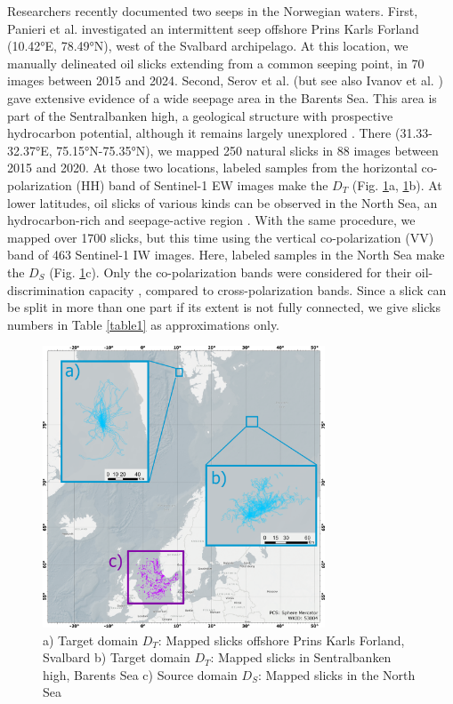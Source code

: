 \documentclass[journal]{IEEEtran}
\begin{document}
Researchers recently documented two seeps in the Norwegian waters. First, Panieri et al. \cite{panieriArcticNaturalOil2024} investigated an intermittent seep offshore Prins Karls Forland 
(10.42°E, 78.49°N), west of the Svalbard archipelago. At this location, we manually delineated oil slicks extending from a common seeping point, in 70 images between 2015 and 2024.
Second, Serov et al. \cite{serovWidespreadNaturalMethane2023} (but see also Ivanov et al. \cite{ivanovSearchDetectionNatural2020}) gave extensive evidence of a wide seepage area in the Barents Sea. 
This area is part of the Sentralbanken high, a geological structure with prospective hydrocarbon potential, although it remains largely unexplored \cite{lundschienNorthBarentsComposite2025}. 
There (31.33-32.37°E, 75.15°N-75.35°N), we mapped 250 natural slicks in 88 images between 2015 and 2020.
At those two locations, labeled samples from the horizontal co-polarization (HH) band of Sentinel-1 EW images make the $\mathit{D}_T$ (Fig. \ref{figure1}a, \ref{figure1}b). 
At lower latitudes, oil slicks of various kinds can be observed in the North Sea, an hydrocarbon-rich and seepage-active region \cite{juddSeabedFluidFlow2009,hovlandSeabedPockmarksSeepages1988}. 
With the same procedure, we mapped over 1700 slicks, but this time using the vertical co-polarization (VV) band of 463 Sentinel-1 IW images. Here, labeled samples in the North Sea make the $\mathit{D}_S$ (Fig. \ref{figure1}c).
Only the co-polarization bands were considered for their oil-discrimination capacity \cite{johanssonMultifrequencyPolarimetricSAR2017,brekkeSAROilSpill2020}, compared to cross-polarization bands.
Since a slick can be split in more than one part if its extent is not fully connected, we give slicks numbers in Table \ref{table1} as approximations only.
\begin{figure}[!t]
    \centering
    \includegraphics[width=3.3in]{figures/layout2_grids.png} %
    \caption{a) Target domain \( \mathit{D}_T \): Mapped slicks offshore Prins Karls Forland, Svalbard \quad b) Target domain \( \mathit{D}_T \): Mapped slicks in Sentralbanken high, Barents Sea \quad 
    c) Source domain \( \mathit{D}_S \): Mapped slicks in the North Sea}
    \label{figure1}
\end{figure}
\end{document}
